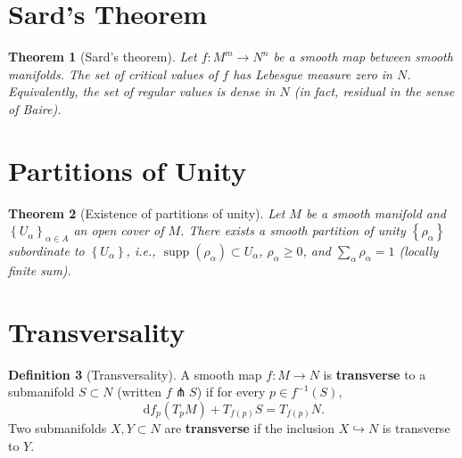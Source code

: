 \documentclass[12pt,a4paper,openany]{book}
\newtheorem{theorem}{Theorem}[section]
\theoremstyle{definition}
\newtheorem{definition}[theorem]{Definition}
\theoremstyle{remark}
\newcommand{\dd}{\,\mathrm{d}}
\newcommand{\set}[1]{\left\{ #1 \right\}}
\begin{document}
\section{Sard's Theorem}\label{sec:app-sard}

\begin{theorem}[Sard's theorem]\label{thm:sard}
Let $f\colon M^m \to N^n$ be a smooth map between smooth manifolds.
The set of critical values of $f$ has Lebesgue measure zero in $N$.
Equivalently, the set of regular values is dense in $N$
(in fact, residual in the sense of Baire).
\end{theorem}

\section{Partitions of Unity}\label{sec:app-partition}

\begin{theorem}[Existence of partitions of unity]\label{thm:app-partition}
Let $M$ be a smooth manifold and $\set{U_\alpha}_{\alpha\in A}$ an
open cover of $M$. There exists a smooth partition of unity
$\set{\rho_\alpha}$ subordinate to $\set{U_\alpha}$, i.e.,
$\operatorname{supp}(\rho_\alpha)\subset U_\alpha$,
$\rho_\alpha \ge 0$, and $\sum_\alpha \rho_\alpha = 1$
(locally finite sum).
\end{theorem}

\section{Transversality}\label{sec:app-transversality}

\begin{definition}[Transversality]\label{def:app-transversality}
A smooth map $f\colon M \to N$ is \textbf{transverse} to a submanifold
$S \subset N$ (written $f \pitchfork S$) if for every $p \in f^{-1}(S)$,
\[
  \dd f_p(T_pM) + T_{f(p)}S = T_{f(p)}N.
\]
Two submanifolds $X,Y \subset N$ are \textbf{transverse} if the inclusion
$X \hookrightarrow N$ is transverse to $Y$.
\end{definition}
\end{document}
